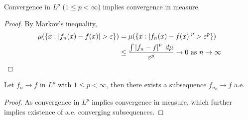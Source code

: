 \documentclass[11pt]{article}
\newcommand{\dmu}[0]{\ d\mu}
\begin{document}
	\begin{proposition}
		Convergence in $L^p$ ($1 \leq p < \infty$) implies convergence in measure.
		\begin{proof}
			By Markov's inequality,
			\begin{align}
				\mu(\{x : \abs{f_n(x) - f(x)} > \varepsilon \}) &= \mu(\{x : \abs{f_n(x) - f(x)}^p > \varepsilon^p \}) \\
				&\leq \frac{\int \abs{f_n - f}^p\dmu}{\varepsilon^p} \to 0 \tx{ as } n \to \infty
			\end{align}
		\end{proof}
	\end{proposition}
	
	\begin{corollary}
		Let $f_n \to f$ in $L^p$ with $1 \leq p < \infty$, then there exists a subsequence $f_{n_k} \to f$ a.e.
		\begin{proof}
			As convergence in $L^p$ implies convergence in measure, which further implies existence of a.e. converging subsequences.
		\end{proof}
	\end{corollary}
	
\end{document}
